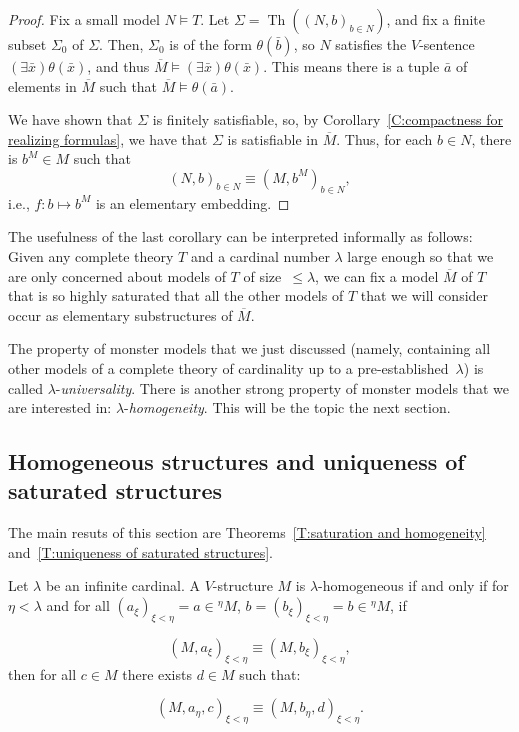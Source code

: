 \documentclass{scrartcl}
\DeclareMathOperator{\Th}{Th}
\begin{document}
\begin{proof}
Fix a small model $N\models T$. Let $\Sigma = \Th ((N,b)_{b\in N})$, and fix a finite subset $\Sigma_0$ of $\Sigma$. Then, $\Sigma_0$ is of the form $\theta(\bar{b})$, so $N$ satisfies the $V$-sentence $(\exists \bar{x})\theta(\bar{x})$, and thus $\overline{M} \models (\exists \bar{x})\theta(\bar{x})$. This means there is a tuple $\bar{a}$ of elements in $\overline{M}$ such that $\overline{M} \models \theta(\bar{a})$.

We have shown that $\Sigma$ is finitely satisfiable, so, by Corollary~\ref{C:compactness for realizing formulas}, we have that $\Sigma$ is satisfiable in $\overline{M}$. Thus, for each $b\in N$, there is $b^M\in M$ such that
\[
(N,b)_{b\in N} \equiv (M, b^M)_{b\in N},
\]
i.e., $f\colon b \mapsto b^M$ is an elementary embedding.
\end{proof}

\begin{remark}
The usefulness of the last corollary can be interpreted informally as follows: Given any complete theory $T$ and a cardinal number $\lambda$ large enough so that we are only concerned about models of $T$ of size~$\le \lambda$, we can fix a model $\overline{M}$ of $T$ that is so highly saturated that all the other models of $T$ that we will consider occur as elementary substructures of $\overline{M}$. 
\end{remark}

The property of monster models that we just discussed (namely, containing all other models of a complete theory of cardinality up to a pre-established~$\lambda$) is called $\lambda$-\emph{universality}. There is another strong property of monster models that we are interested in: $\lambda$-\emph{homogeneity}. This will be the topic the next section.


\subsection{Homogeneous structures and uniqueness of saturated structures}


The main resuts of this section are Theorems~\ref{T:saturation and homogeneity} and~\ref{T:uniqueness of saturated structures}.

\begin{definition}
Let $\lambda$ be an infinite cardinal. A $V$-structure $M$ is $\lambda$-homogeneous if and only if for $\eta<\lambda$ and for all $(a_\xi)_{\xi<\eta}=a\in{}^\eta M$, $b=(b_\xi)_{\xi<\eta}=b\in{}^\eta M$, if

\[
(M,a_\xi)_{\xi<\eta} \equiv  (M,b_\xi)_{\xi<\eta},
\]
then for all $c\in M$ there exists $d\in M$ such that:

\[
(M,a_\eta,c)_{\xi<\eta} \equiv (M,b_\eta,d)_{\xi<\eta}.
\]

\end{definition}
\end{document}

